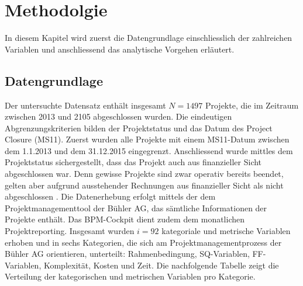 \chapter{Methodolgie}\label{sec:methode}
In diesem Kapitel wird zuerst die Datengrundlage einschliesslich der zahlreichen Variablen und anschliessend das analytische Vorgehen erläutert.  
\section{Datengrundlage}\label{sec:datagr}
Der untersuchte Datensatz enthält insgesamt $N = 1497$ Projekte, die im Zeitraum zwischen 2013 und 2105 abgeschlossen wurden. Die eindeutigen Abgrenzungskriterien bilden der Projektstatus und das Datum des Project Closure (MS11). Zuerst wurden alle Projekte mit einem MS11-Datum zwischen dem 1.1.2013 und dem 31.12.2015 eingegrenzt. Anschliessend wurde mittles dem Projektstatus sichergestellt, dass das Projekt auch aus finanzieller Sicht abgeschlossen war. Denn gewisse Projekte sind zwar operativ bereits beendet, gelten aber aufgrund ausstehender Rechnungen aus finanzieller Sicht als \glqq nicht abgeschlossen \grqq{}. Die Datenerhebung erfolgt mittels der dem Projektmanagementtool der Bühler AG, das sämtliche Informationen der Projekte enthält. Das BPM-Cockpit dient zudem dem monatlichen Projektreporting.
\newline\newline
Insgesamt wurden $i = 92$ kategoriale und metrische Variablen erhoben und in sechs Kategorien, die sich am Projektmanagementprozess der Bühler AG orientieren, unterteilt: Rahmenbedingung, SQ-Variablen, FF-Variablen, Komplexität, Kosten und Zeit. Die nachfolgende Tabelle zeigt die Verteilung der kategorischen und metrischen Variablen pro Kategorie.
